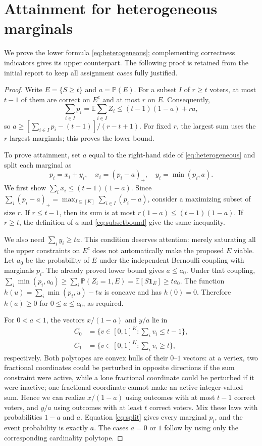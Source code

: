 \documentclass{article}
\newcommand{\Prb}{\mathbb P}
\newcommand{\Ex}{\mathbb E}
\newcommand{\ind}{\mathbf 1}
\begin{document}
\section{Attainment for heterogeneous marginals}\label{app:marginal}
We prove the lower formula \eqref{eq:heterogeneous}; complementing correctness indicators gives its upper counterpart. The following proof is retained from the initial report to keep all assignment cases fully justified.
\begin{proof}
Write $E=\{S\ge t\}$ and $a=\Prb(E)$. For a subset $I$ of $r\ge t$ voters, at most $t-1$ of them are correct on $E^c$ and at most $r$ on $E$. Consequently,
\begin{equation}\label{eq:subsetbound}
 \sum_{i\in I}p_i=\Ex\sum_{i\in I}Z_i
 \le (t-1)(1-a)+ra,
\end{equation}
so $a\ge[\sum_{i\in I}p_i-(t-1)]/(r-t+1)$. For fixed $r$, the largest sum uses the $r$ largest marginals; this proves the lower bound.

To prove attainment, set $a$ equal to the right-hand side of \eqref{eq:heterogeneous} and split each marginal as
\begin{equation}\label{eq:split}
 p_i=x_i+y_i,\quad x_i=(p_i-a)_+,\quad y_i=\min(p_i,a).
\end{equation}
We first show $\sum_i x_i\le (t-1)(1-a)$. Since
$\sum_i(p_i-a)_+=\max_{I\subseteq[K]}\sum_{i\in I}(p_i-a)$, consider a maximizing subset of size $r$. If $r\le t-1$, then its sum is at most $r(1-a)\le(t-1)(1-a)$. If $r\ge t$, the definition of $a$ and \eqref{eq:subsetbound} give the same inequality.

We also need $\sum_i y_i\ge ta$. This condition deserves attention: merely saturating all the upper constraints on $E^c$ does not automatically make the proposed $E$ viable. Let $a_0$ be the probability of $E$ under the independent Bernoulli coupling with marginals $p_i$. The already proved lower bound gives $a\le a_0$. Under that coupling,
$\sum_i\min(p_i,a_0)\ge\sum_i\Prb(Z_i=1,E)=\Ex[S\ind_E]\ge ta_0$.
The function $h(u)=\sum_i\min(p_i,u)-tu$ is concave and has $h(0)=0$. Therefore $h(a)\ge0$ for $0\le a\le a_0$, as required.

For $0<a<1$, the vectors $x/(1-a)$ and $y/a$ lie in
\begin{align*}
 C_0&=\{v\in[0,1]^K:\sum_i v_i\le t-1\},\\
 C_1&=\{v\in[0,1]^K:\sum_i v_i\ge t\},
\end{align*}
respectively. Both polytopes are convex hulls of their $0$--$1$ vectors: at a vertex, two fractional coordinates could be perturbed in opposite directions if the sum constraint were active, while a lone fractional coordinate could be perturbed if it were inactive; one fractional coordinate cannot make an active integer-valued sum. Hence we can realize $x/(1-a)$ using outcomes with at most $t-1$ correct voters, and $y/a$ using outcomes with at least $t$ correct voters. Mix these laws with probabilities $1-a$ and $a$. Equation \eqref{eq:split} gives every marginal $p_i$, and the event probability is exactly $a$. The cases $a=0$ or $1$ follow by using only the corresponding cardinality polytope.
\end{proof}
\end{document}
